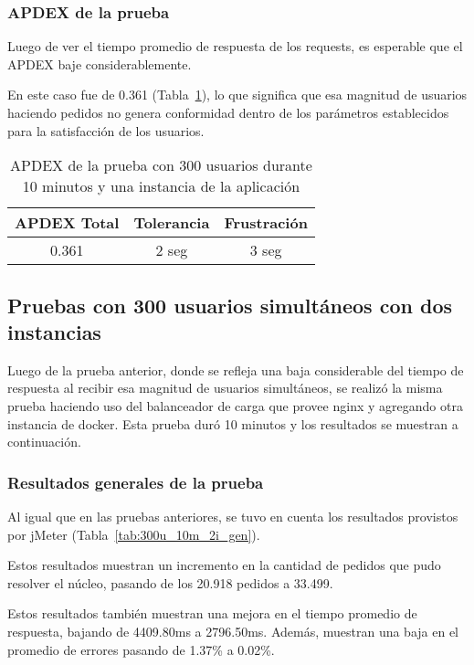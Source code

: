 \subsubsection{APDEX de la prueba}

Luego de ver el tiempo promedio de respuesta de los requests, es esperable que el APDEX baje considerablemente.

En este caso fue de 0.361 (Tabla~\ref{tab:300u_10m_apdex}), lo que significa que esa magnitud de usuarios haciendo pedidos no genera conformidad dentro de los parámetros establecidos para la satisfacción de los usuarios.

\begin{table}[!htbp]
    \centering
    \makegapedcells
    \begin{tabular}{|c|c|c|}
    \hline
    APDEX Total & Tolerancia & Frustración\\ \hline
    0.361 & 2 seg & 3 seg \\ \hline
    \end{tabular}
    \caption{APDEX de la prueba con 300 usuarios durante 10 minutos y una instancia de la aplicación}
    \label{tab:300u_10m_apdex}
\end{table}


\subsection{Pruebas con 300 usuarios simultáneos con dos instancias}
Luego de la prueba anterior, donde se refleja una baja considerable del tiempo de respuesta al recibir esa magnitud de usuarios simultáneos, se realizó la misma prueba haciendo uso del balanceador de carga que provee nginx y agregando otra instancia de docker.
Esta prueba duró 10 minutos y los resultados se muestran a continuación.

\subsubsection{Resultados generales de la prueba}

Al igual que en las pruebas anteriores, se tuvo en cuenta los resultados provistos por jMeter (Tabla~\ref{tab:300u_10m_2i_gen}).

Estos resultados muestran un incremento en la cantidad de pedidos que pudo resolver el núcleo, pasando de los 20.918 pedidos a 33.499.

Estos resultados también muestran una mejora en el tiempo promedio de respuesta, bajando de 4409.80ms a 2796.50ms. Además, muestran una baja en el promedio de errores pasando de 1.37\% a 0.02\%.


